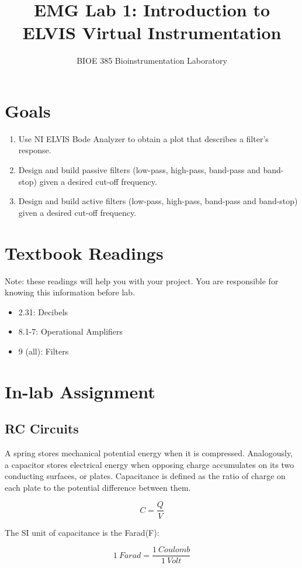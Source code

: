 \documentclass{article}
\title{EMG Lab 1: Introduction to ELVIS Virtual Instrumentation}
\author{BIOE 385 Bioinstrumentation Laboratory}
\date{}
\begin{document}
\large
\maketitle

\section*{Goals}
\begin{enumerate}
	\item Use NI ELVIS Bode Analyzer to obtain a plot that describes a filter’s response.
	\item Design and build passive filters (low-pass, high-pass, band-pass and band-stop) given a desired cut-off frequency.
	\item Design and build active filters (low-pass, high-pass, band-pass and band-stop) given a desired cut-off frequency.
\end{enumerate}

\section*{Textbook Readings}
Note: these readings will help you with your project.  You are responsible for knowing this information before lab.
\begin{itemize}
	\item 2.31: Decibels
	\item 8.1-7: Operational Amplifiers
	\item 9 (all): Filters
\end{itemize}

\section*{In-lab Assignment}
\subsection*{RC Circuits}

A spring stores mechanical potential energy when it is compressed. Analogously, a capacitor stores electrical energy when opposing charge accumulates on its two conducting surfaces, or plates. Capacitance is defined as the ratio of charge on each plate to the potential difference between them.

$$C = \frac{Q}{V}$$

The SI unit of capacitance is the Farad(F):

$$1\ Farad = \frac{1\ Coulomb}{1\ Volt}$$
\end{document}
